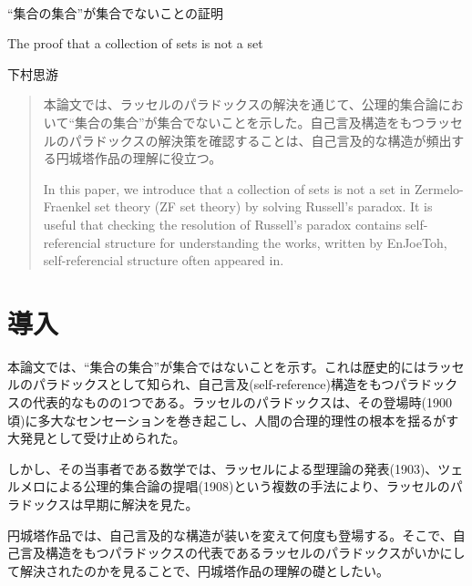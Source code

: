 \documentclass[10pt, a5paper, twoside]{jsarticle}
\theoremstyle{definition}
\begin{document}
	{\Large 　} %

	\begin{center}

		\Large{“集合の集合”が集合でないことの証明}

		\vspace{3mm}

		\large{The proof that a collection of sets is not a set}

		\vspace{3mm}
		
		\large{下村思游}

	\end{center}

	\vspace{3mm}

	\begin{abstract}

		本論文では、ラッセルのパラドックスの解決を通じて、公理的集合論において“集合の集合”が集合でないことを示した。自己言及構造をもつラッセルのパラドックスの解決策を確認することは、自己言及的な構造が頻出する円城塔作品の理解に役立つ。

		\vspace{3mm}

		In this paper, we introduce that a collection of sets is not a set in Zermelo-Fraenkel set theory (ZF set theory) by solving Russell's paradox. It is useful that checking the resolution of Russell's paradox contains self-referencial structure for understanding the works, written by EnJoeToh, self-referencial structure often appeared in.

	\end{abstract}

	\section{導入}

		本論文では、“集合の集合”が集合ではないことを示す。これは歴史的にはラッセルのパラドックスとして知られ、自己言及(self-reference)構造をもつパラドックスの代表的なものの1つである。ラッセルのパラドックスは、その登場時(1900頃)\cite{fre,dis}に多大なセンセーションを巻き起こし、人間の合理的理性の根本を揺るがす大発見として受け止められた\cite{noe}。

		しかし、その当事者である数学では、ラッセルによる型理論の発表(1903)\cite{rus}、ツェルメロによる公理的集合論の提唱(1908)\cite{zer}という複数の手法により、ラッセルのパラドックスは早期に解決を見た。

		円城塔作品では、自己言及的な構造が装いを変えて何度も登場する。そこで、自己言及構造をもつパラドックスの代表であるラッセルのパラドックスがいかにして解決されたのかを見ることで、円城塔作品の理解の礎としたい。
\end{document}
